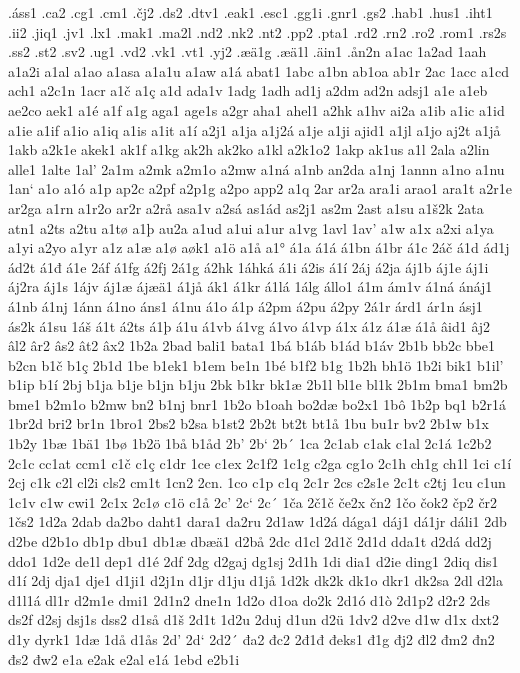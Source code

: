 .áss1
.ca2
.cg1
.cm1
.čj2
.ds2
.dtv1
.eak1
.esc1
.gg1i
.gnr1
.gs2
.hab1
.hus1
.iht1
.ii2
.jiq1
.jv1
.lx1
.mak1
.ma2l
.nd2
.nk2
.nt2
.pp2
.pta1
.rd2
.rn2
.ro2
.rom1
.rs2s
.ss2
.st2
.sv2
.ug1
.vd2
.vk1
.vt1
.yj2
.æä1g
.æä1l
.äin1
.ån2n
a1ac
1a2ad
1aah
a1a2i
a1al
a1ao
a1asa
a1a1u
a1aw
a1á
abat1
1abc
a1bn
ab1oa
ab1r
2ac
1acc
a1cd
ach1
a2c1n
1acr
a1č
a1ç
a1d
ada1v
1adg
1adh
ad1j
a2dm
ad2n
adsj1
a1e
a1eb
ae2co
aek1
a1é
a1f
a1g
aga1
age1s
a2gr
aha1
ahel1
a2hk
a1hv
ai2a
a1ib
a1ic
a1id
a1ie
a1if
a1io
a1iq
a1is
a1it
a1í
a2j1
a1ja
a1j2á
a1je
a1ji
ajid1
a1jl
a1jo
aj2t
a1jå
1akb
a2k1e
akek1
ak1f
a1kg
ak2h
ak2ko
a1kl
a2k1o2
1akp
ak1us
a1l
2ala
a2lin
alle1
1alte
1al'
2a1m
a2mk
a2m1o
a2mw
a1ná
a1nb
an2da
a1nj
1annn
a1no
a1nu
1an`
a1o
a1ó
a1p
ap2c
a2pf
a2p1g
a2po
app2
a1q
2ar
ar2a
ara1i
arao1
ara1t
a2r1e
ar2ga
a1rn
a1r2o
ar2r
a2rå
asa1v
a2sá
as1ád
as2j1
as2m
2ast
a1su
a1š2k
2ata
atn1
a2ts
a2tu
a1tø
a1þ
au2a
a1ud
a1ui
a1ur
a1vg
1avl
1av'
a1w
a1x
a2xi
a1ya
a1yi
a2yo
a1yr
a1z
a1æ
a1ø
aøk1
a1ö
a1å
a1°
á1a
á1á
á1bn
á1br
á1c
2áč
á1d
ád1j
ád2t
á1đ
á1e
2áf
á1fg
á2fj
2á1g
á2hk
1áhká
á1i
á2is
á1í
2áj
á2ja
áj1b
áj1e
áj1i
áj2ra
áj1s
1ájv
áj1æ
ájæä1
á1jå
ák1
á1kr
á1lá
1álg
állo1
á1m
ám1v
á1ná
ánáj1
á1nb
á1nj
1ánn
á1no
áns1
á1nu
á1o
á1p
á2pm
á2pu
á2py
2á1r
árd1
ár1n
ásj1
ás2k
á1su
1áš
á1t
á2ts
á1þ
á1u
á1vb
á1vg
á1vo
á1vp
á1x
á1z
á1æ
á1å
âid1
âj2
âl2
âr2
âs2
ât2
âx2
1b2a
2bad
bali1
bata1
1bá
b1áb
b1ád
b1áv
2b1b
bb2c
bbe1
b2cn
b1č
b1ç
2b1d
1be
b1ek1
b1em
be1n
1bé
b1f2
b1g
1b2h
bh1ö
1b2i
bik1
b1il'
b1ip
b1í
2bj
b1ja
b1je
b1jn
b1ju
2bk
b1kr
bk1æ
2b1l
bl1e
bl1k
2b1m
bma1
bm2b
bme1
b2m1o
b2mw
bn2
b1nj
bnr1
1b2o
b1oah
bo2dæ
bo2x1
1bô
1b2p
bq1
b2r1á
1br2d
bri2
br1n
1bro1
2bs2
b2sa
b1st2
2b2t
bt2t
bt1å
1bu
bu1r
bv2
2b1w
b1x
1b2y
1bæ
1bä1
1bø
1b2ö
1bå
b1åd
2b'
2b`
2b´
1ca
2c1ab
c1ak
c1al
2c1á
1c2b2
2c1c
cc1at
ccm1
c1č
c1ç
c1dr
1ce
c1ex
2c1f2
1c1g
c2ga
cg1o
2c1h
ch1g
ch1l
1ci
c1í
2cj
c1k
c2l
cl2i
cls2
cm1t
1cn2
2cn.
1co
c1p
c1q
2c1r
2cs
c2s1e
2c1t
c2tj
1cu
c1un
1c1v
c1w
cwi1
2c1x
2c1ø
c1ö
c1å
2c'
2c`
2c´
1ča
2č1č
če2x
čn2
1čo
čok2
čp2
čr2
1čs2
1d2a
2dab
da2bo
daht1
dara1
da2ru
2d1aw
1d2á
dága1
dáj1
dá1jr
dáli1
2db
d2be
d2b1o
db1p
dbu1
db1æ
dbæä1
d2bå
2dc
d1cl
2d1č
2d1d
dda1t
d2dá
dd2j
ddo1
1d2e
de1l
dep1
d1é
2df
2dg
d2gaj
dg1sj
2d1h
1di
dia1
d2ie
ding1
2diq
dis1
d1í
2dj
dja1
dje1
d1ji1
d2j1n
d1jr
d1ju
d1jå
1d2k
dk2k
dk1o
dkr1
dk2sa
2dl
d2la
d1l1á
dl1r
d2m1e
dmi1
2d1n2
dne1n
1d2o
d1oa
do2k
2d1ó
d1ò
2d1p2
d2r2
2ds
ds2f
d2sj
dsj1s
dss2
d1så
d1š
2d1t
1d2u
2duj
d1un
d2ü
1dv2
d2ve
d1w
d1x
dxt2
d1y
dyrk1
1dæ
1då
d1ås
2d'
2d`
2d2´
đa2
đc2
2đ1đ
đeks1
đ1g
đj2
đl2
đm2
đn2
đs2
đw2
e1a
e2ak
e2al
e1á
1ebd
e2b1i
